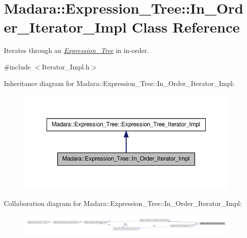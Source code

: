 \hypertarget{classMadara_1_1Expression__Tree_1_1In__Order__Iterator__Impl}{
\section{Madara::Expression\_\-Tree::In\_\-Order\_\-Iterator\_\-Impl Class Reference}
\label{d5/d7e/classMadara_1_1Expression__Tree_1_1In__Order__Iterator__Impl}
}


Iterates through an {\itshape \hyperlink{classMadara_1_1Expression__Tree_1_1Expression__Tree}{Expression\_\-Tree}\/} in in-\/order.  




{\ttfamily \#include $<$Iterator\_\-Impl.h$>$}



Inheritance diagram for Madara::Expression\_\-Tree::In\_\-Order\_\-Iterator\_\-Impl:
\nopagebreak
\begin{figure}[H]
\begin{center}
\leavevmode
\includegraphics[width=348pt]{d0/d4a/classMadara_1_1Expression__Tree_1_1In__Order__Iterator__Impl__inherit__graph}
\end{center}
\end{figure}


Collaboration diagram for Madara::Expression\_\-Tree::In\_\-Order\_\-Iterator\_\-Impl:
\nopagebreak
\begin{figure}[H]
\begin{center}
\leavevmode
\includegraphics[width=400pt]{d4/d0b/classMadara_1_1Expression__Tree_1_1In__Order__Iterator__Impl__coll__graph}
\end{center}
\end{figure}
